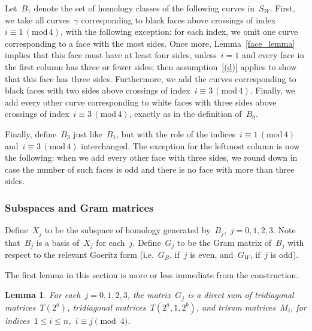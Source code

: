 \documentclass[10pt,a4paper]{amsart}
\numberwithin{equation}{section}
\newcommand{\rmod}{\mathrm{mod}}
\newtheorem{lemm}[theo]{Lemma}
\begin{document}
Let~$B_1$ denote the set of homology classes of the following curves in~$S_W$. First, we take all curves~$\gamma$ corresponding to black faces above crossings of index~$i\equiv1\,(\rmod\,4)$, with the following exception: for each index, we omit one curve corresponding to a face with the most sides. Once more, Lemma~\ref{face_lemma} implies that this face must have at least four sides, unless~$i=1$ and every face in the first column has three or fewer sides; then assumption~\eqref{(d)} applies to show that this face has three sides. Furthermore, we add the curves corresponding to black faces with two sides above crossings of index~$i\equiv3\,(\rmod\,4)$. Finally, we add every other curve corresponding to white faces with three sides above crossings of index~$i\equiv3\,(\rmod\,4)$, exactly as in the definition of~$B_0$.

Finally, define~$B_3$ just like~$B_1$, but with the role of the indices~$i\equiv1\,(\rmod\,4)$ and~$i\equiv3\,(\rmod\,4)$ interchanged. The exception for the leftmost column is now the following: when we add every other face with three sides, we round down in case the number of such faces is odd and there is no face with more than three sides.

\subsubsection{Subspaces and Gram matrices}

Define~$X_j$ to be the subspace of homology generated by~$B_j$,~$j=0,1,2,3$. Note that~$B_j$ is a basis of~$X_j$ for each~$j$. Define~$G_j$ to be the Gram matrix of~$B_j$ with respect to the relevant Goeritz form (i.e.~$G_B$, if~$j$ is even, and~$G_W$, if~$j$ is odd).


The first lemma in this section is more or less immediate from the construction.

\begin{lemm}\label{form_lem}
For each~$j=0,1,2,3$, the matrix~$G_j$ is a direct sum of tridiagonal matrices~$T(2^{\underline a})$, tridiagonal matrices~$T(2^{\underline a},1,2^{\underline b})$, and trisum matrices~$M_i$, for indices~$1 \le i \le n$,~$i \equiv j \pmod 4$.
\end{lemm}
\end{document}
